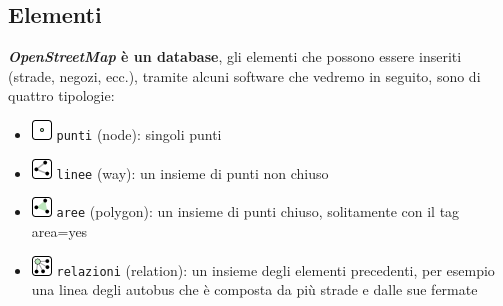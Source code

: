 \documentclass[a4paper,twoside,12pt,]{article}
\newcommand{\osm}{\emph{OpenStreetMap}\xspace}
\begin{document}
\subsection{Elementi}
\textbf{\osm è un database}, gli elementi che possono essere inseriti (strade, negozi, ecc.), tramite alcuni software che vedremo in seguito, sono di quattro tipologie:
\begin{itemize}
 \item \includegraphics{./Mf_node.png} \texttt{punti} (node): singoli punti
 \item \includegraphics{./Mf_way.png} \texttt{linee} (way): un insieme di punti non chiuso
 \item \includegraphics{./Mf_area.png} \texttt{aree} (polygon): un insieme di punti chiuso, solitamente con il tag area=yes
 \item \includegraphics{./Mf_relation.png} \texttt{relazioni} (relation): un insieme degli elementi precedenti, per esempio una linea degli autobus che è composta da più strade e dalle sue fermate
\end{itemize}
\end{document}
